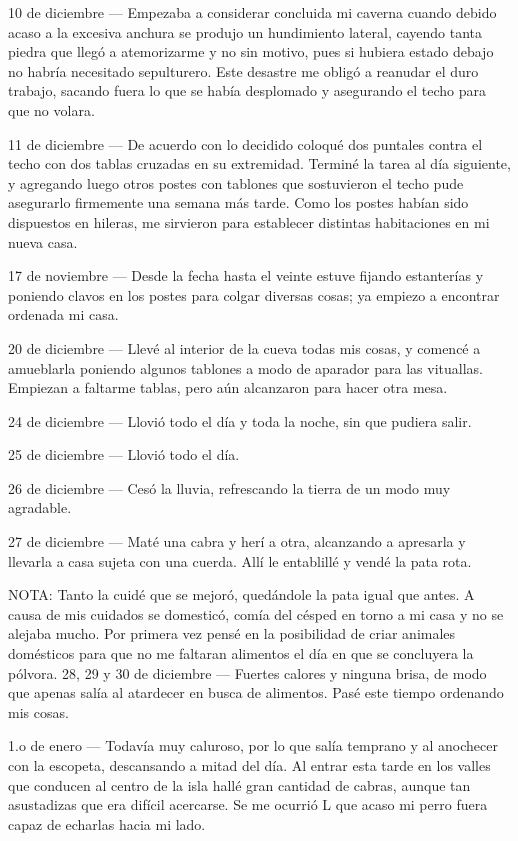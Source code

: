 \documentclass{novela}
\begin{document}
    10 de diciembre — Empezaba a considerar concluida mi caverna cuando debido acaso a la excesiva anchura se produjo un hundimiento lateral, cayendo tanta piedra que llegó a atemorizarme y no sin motivo, pues si hubiera estado debajo no habría necesitado sepulturero. Este desastre me obligó a reanudar el duro trabajo, sacando fuera lo que se había desplomado y asegurando el techo para que no volara.


    11 de diciembre — De acuerdo con lo decidido coloqué dos puntales contra el techo con dos tablas cruzadas en su extremidad. Terminé la tarea al día siguiente, y agregando luego otros postes con tablones que sostuvieron el techo pude asegurarlo firmemente una semana más tarde. Como los postes habían sido dispuestos en hileras, me sirvieron para establecer distintas habitaciones en mi nueva casa.


    17 de noviembre — Desde la fecha hasta el veinte estuve fijando estanterías y poniendo clavos en los postes para colgar diversas cosas; ya empiezo a encontrar ordenada mi casa.


    20 de diciembre — Llevé al interior de la cueva todas mis cosas, y comencé a amueblarla poniendo algunos tablones a modo de aparador para las vituallas. Empiezan a faltarme tablas, pero aún alcanzaron para hacer otra mesa.


    24 de diciembre — Llovió todo el día y toda la noche, sin que pudiera salir.


    25 de diciembre — Llovió todo el día.


    26 de diciembre — Cesó la lluvia, refrescando la tierra de un modo muy agradable.


    27 de diciembre — Maté una cabra y herí a otra, alcanzando a apresarla y llevarla a casa sujeta con una cuerda. Allí le entablillé y vendé la pata rota.


    NOTA: Tanto la cuidé que se mejoró, quedándole la pata igual que antes. A causa de mis cuidados se domesticó, comía del césped en torno a mi casa y no se alejaba mucho. Por primera vez pensé en la posibilidad de criar animales domésticos para que no me faltaran alimentos el día en que se concluyera la pólvora.
    28, 29 y 30 de diciembre — Fuertes calores y ninguna brisa, de modo que apenas salía al atardecer en busca de alimentos. Pasé este tiempo ordenando mis cosas.


    1.o de enero — Todavía muy caluroso, por lo que salía temprano y al anochecer con la escopeta, descansando a mitad del día. Al entrar esta tarde en los valles que conducen al centro de la isla hallé gran cantidad de cabras, aunque tan asustadizas que era difícil acercarse. Se me ocurrió  L que acaso mi perro fuera capaz de echarlas hacia mi lado.
\end{document}
